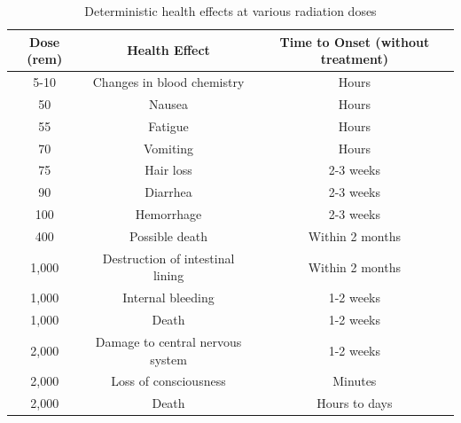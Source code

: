 \documentclass{report}
\begin{document}
 


\begin{table}[h]
\centering
\begin{tabular}{|c|c|c|}
\hline
\textbf{Dose (rem)} & \textbf{Health Effect}           & \textbf{Time to Onset (without treatment)} \\ \hline
5-10                    & Changes in blood chemistry       & Hours                                      \\ \hline
50                      & Nausea                           & Hours                                      \\ \hline
55                      & Fatigue                          & Hours                                      \\ \hline
70                      & Vomiting                         & Hours                                      \\ \hline
75                      & Hair loss                        & 2-3 weeks                                  \\ \hline
90                      & Diarrhea                         & 2-3 weeks                                  \\ \hline
100                     & Hemorrhage                       & 2-3 weeks                                  \\ \hline
400                     & Possible death                   & Within 2 months                            \\ \hline
1,000                   & Destruction of intestinal lining & Within 2 months                            \\ \hline
1,000                   & Internal bleeding                & 1-2 weeks                                  \\ \hline
1,000                   & Death                            & 1-2 weeks                                  \\ \hline
2,000                   & Damage to central nervous system & 1-2 weeks                                  \\ \hline
2,000                   & Loss of consciousness            & Minutes                                    \\ \hline
2,000                   & Death                            & Hours to days                              \\ \hline
\end{tabular}
\caption[Deterministic health effects at various radiation doses \cite{USEPA1999}]{Deterministic health effects at various radiation doses \cite{USEPA1999} \footnotemark}
\label{tab:health_effects}
\end{table} 
\end{document}
